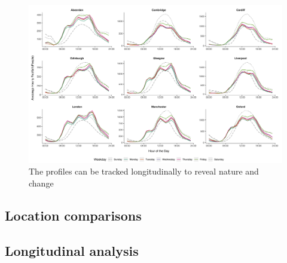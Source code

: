 \begin{figure}
  \includegraphics[trim={0 10 0 0},clip]{images/applications-city-profiles.png}
  \caption{The profiles can be tracked longitudinally to reveal nature and change}
  \label{}
\end{figure}


\subsection{Location comparisons}
\lipsum[1]

\subsection{Longitudinal analysis}

\lipsum[1]

